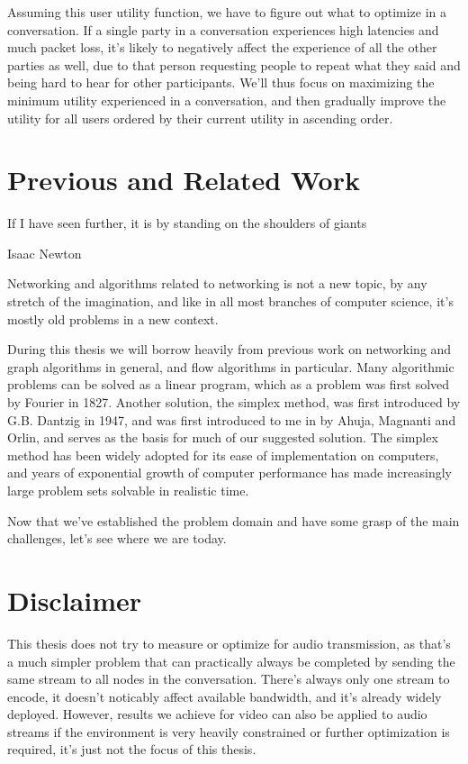 Assuming this user utility function, we have to figure out what to optimize in a conversation. If a single party in a conversation experiences high latencies and much packet loss, it's likely to negatively affect the experience of all the other parties as well, due to that person requesting people to repeat what they said and being hard to hear for other participants. We'll thus focus on maximizing the minimum utility experienced in a conversation, and then gradually improve the utility for all users ordered by their current utility in ascending order.


\section{Previous and Related Work}

\epigraph{If I have seen further, it is by standing on the shoulders of giants}{Isaac Newton}

Networking and algorithms related to networking is not a new topic, by any stretch of the imagination, and like in all most branches of computer science, it's mostly old problems in a new context.

During this thesis we will borrow heavily from previous work on networking and graph algorithms in general, and flow algorithms in particular. Many algorithmic problems can be solved as a linear program, which as a problem was first solved by Fourier in 1827\cite{sierksma2001linear}. Another solution, the simplex method, was first introduced by G.B. Dantzig in 1947\cite{sierksma2001linear}, and was first introduced to me in \cite{ahuja1988network} by Ahuja, Magnanti and Orlin, and serves as the basis for much of our suggested solution. The simplex method has been widely adopted for its ease of implementation on computers, and years of exponential growth of computer performance has made increasingly large problem sets solvable in realistic time.

Now that we've established the problem domain and have some grasp of the main challenges, let's see where we are today.


\section{Disclaimer}

This thesis does not try to measure or optimize for audio transmission, as that's a much simpler problem that can practically always be completed by sending the same stream to all nodes in the conversation. There's always only one stream to encode, it doesn't noticably affect available bandwidth, and it's already widely deployed. However, results we achieve for video can also be applied to audio streams if the environment is very heavily constrained or further optimization is required, it's just not the focus of this thesis.
